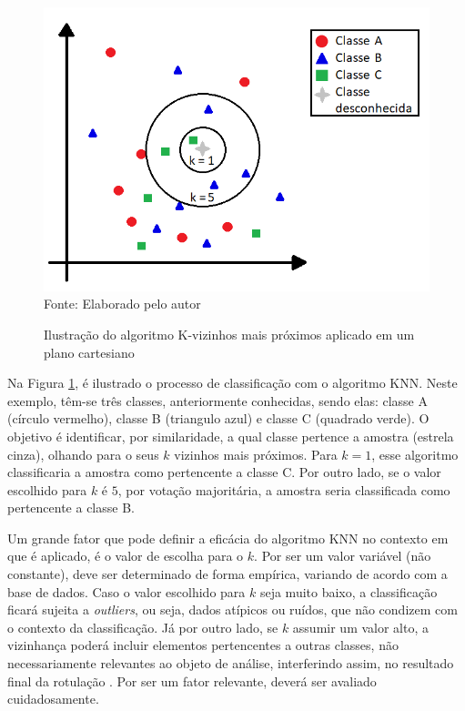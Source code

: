 \begin{figure}[ht!]
\caption{Ilustração do algoritmo K-vizinhos mais próximos aplicado em um plano cartesiano}
\label{fig:knnExample}
\centering
\includegraphics[scale=0.5]{img/knnExample.png}
{\fontsize{11pt}{\baselineskip}\selectfont
\\Fonte: Elaborado pelo autor
}
\end{figure}

Na Figura \ref{fig:knnExample}, é ilustrado o processo de classificação com o algoritmo KNN. Neste exemplo, têm-se três classes, anteriormente conhecidas, sendo elas: classe A (círculo vermelho), classe B (triangulo azul) e classe C (quadrado verde). O objetivo é identificar, por similaridade, a qual classe pertence a amostra (estrela cinza), olhando para o seus $k$ vizinhos mais próximos. Para $k = 1$, esse algoritmo classificaria a amostra como pertencente a classe C. Por outro lado, se o valor escolhido para $k$ é $5$, por votação majoritária, a amostra seria classificada como pertencente a classe B.

Um grande fator que pode definir a eficácia do algoritmo KNN no contexto em que é aplicado, é o valor de escolha para o $k$. Por ser um valor variável (não constante), deve ser determinado de forma empírica, variando de acordo com a base de dados. Caso o valor escolhido para $k$ seja muito baixo, a classificação ficará sujeita a \textit{outliers}, ou seja, dados atípicos ou ruídos, que não condizem com o contexto da classificação. Já por outro lado, se $k$ assumir um valor alto, a vizinhança poderá incluir elementos pertencentes a outras classes, não necessariamente relevantes ao objeto de análise, interferindo assim, no resultado final da rotulação \citep{fukunaga1975knn}. Por ser um fator relevante, deverá ser avaliado cuidadosamente.



